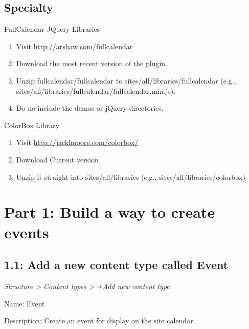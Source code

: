 \documentclass[letterpaper,10pt,english]{sphinxmanual}
\begin{document}
\subsection{Specialty}
\label{event_calendar:specialty}
FullCalendar JQuery Libraries
\begin{enumerate}
\item {} 
Visit \href{http://arshaw.com/fullcalendar}{http://arshaw.com/fullcalendar}

\item {} 
Download the most recent version of the plugin.

\item {} 
Unzip fullcalendar/fullcalendar to sites/all/libraries/fullcalendar (e.g., sites/all/libraries/fullcalendar/fullcalendar.min.js).

\item {} 
Do no include the demos or jQuery directories.

\end{enumerate}

ColorBox Library
\begin{enumerate}
\item {} 
Visit \href{http://jacklmoore.com/colorbox/}{http://jacklmoore.com/colorbox/}

\item {} 
Download Current version

\item {} 
Unzip it straight into sites/all/libraries (e.g., sites/all/libraries/colorbox)

\end{enumerate}


\section{Part 1: Build a way to create events}
\label{event_calendar:part-1-build-a-way-to-create-events}

\subsection{1.1: Add a new content type called Event}
\label{event_calendar:add-a-new-content-type-called-event}
\emph{Structure \textgreater{} Content types \textgreater{} +Add new content type}

Name: Event

Description: Create an event for display on the site calendar
\end{document}
